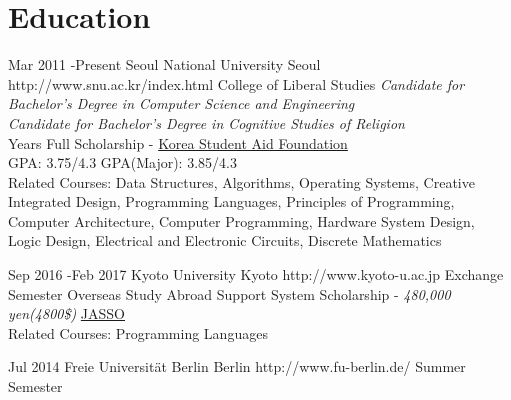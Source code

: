 \documentclass[10pt]{article} %
\begin{document}
\section{Education}

\job
{Mar 2011 -}{Present}
{Seoul National University}
{Seoul}
{http://www.snu.ac.kr/index.html}
{College of Liberal Studies}
{
\textit{Candidate for Bachelor's Degree in Computer Science and Engineering}\\
\if{}
\textit{Candidate for Bachelor's Degree in Cognitive Studies of Religion}\\
 Years Full Scholarship - \href{http://eng.kosaf.go.kr/jsp/main.jsp}{Korea Student Aid Foundation}\\
GPA: 3.75/4.3 \hspace{10mm} GPA(Major): 3.85/4.3\\
Related Courses: Data Structures, Algorithms, Operating Systems, Creative Integrated Design, Programming Languages, Principles of Programming, Computer Architecture, Computer Programming, Hardware System Design, Logic Design, Electrical and Electronic Circuits, Discrete Mathematics
}


\if{}
\job
{Sep 2016 -}{Feb 2017}
{Kyoto University}
{Kyoto}
{http://www.kyoto-u.ac.jp}
{Exchange Semester}
{
Overseas Study Abroad Support System Scholarship - \textit{480,000 yen(4800\$)} \href{http://www.jasso.go.jp/ryugaku/tantosha/study_a/short_term_h/index.html}{JASSO}\\
Related Courses: Programming Languages
}
\fi



\if{}
\job
{Jul 2014}{}
{Freie Universität Berlin}
{Berlin}
{http://www.fu-berlin.de/}
{Summer Semester}
\fi
\end{document}
